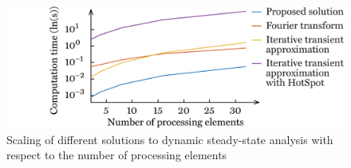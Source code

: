 \begin{figure}
  \centering
  \includegraphics[width=1.0\linewidth]{include/assets/figures/dream-dynamic-steady-speed-elements.pdf}
  \caption{
    Scaling of different solutions to dynamic steady-state analysis with respect
    to the number of processing elements
  }
\end{figure}
